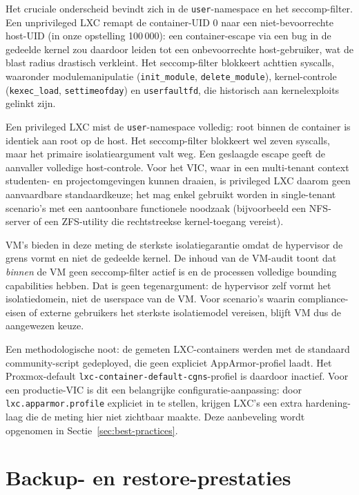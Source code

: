 Het cruciale onderscheid bevindt zich in de \texttt{user}-namespace en het seccomp-filter. Een unprivileged LXC remapt de container-UID 0 naar een niet-bevoorrechte host-UID (in onze opstelling 100\,000): een container-escape via een bug in de gedeelde kernel zou daardoor leiden tot een onbevoorrechte host-gebruiker, wat de blast radius drastisch verkleint. Het seccomp-filter blokkeert achttien syscalls, waaronder modulemanipulatie (\texttt{init\_module}, \texttt{delete\_module}), kernel-controle (\texttt{kexec\_load}, \texttt{settimeofday}) en \texttt{userfaultfd}, die historisch aan kernelexploits gelinkt zijn.

Een privileged LXC mist de \texttt{user}-namespace volledig: root binnen de container is identiek aan root op de host. Het seccomp-filter blokkeert wel zeven syscalls, maar het primaire isolatieargument valt weg. Een geslaagde escape geeft de aanvaller volledige host-controle. Voor het VIC, waar in een multi-tenant context studenten- en projectomgevingen kunnen draaien, is privileged LXC daarom geen aanvaardbare standaardkeuze; het mag enkel gebruikt worden in single-tenant scenario's met een aantoonbare functionele noodzaak (bijvoorbeeld een NFS-server of een ZFS-utility die rechtstreekse kernel-toegang vereist).

VM's bieden in deze meting de sterkste isolatiegarantie omdat de hypervisor de grens vormt en niet de gedeelde kernel. De inhoud van de VM-audit toont dat \emph{binnen} de VM geen seccomp-filter actief is en de processen volledige bounding capabilities hebben. Dat is geen tegenargument: de hypervisor zelf vormt het isolatiedomein, niet de userspace van de VM. Voor scenario's waarin compliance-eisen of externe gebruikers het sterkste isolatiemodel vereisen, blijft VM dus de aangewezen keuze.

Een methodologische noot: de gemeten LXC-containers werden met de standaard community-script gedeployed, die geen expliciet AppArmor-profiel laadt. Het Proxmox-default \texttt{lxc-container-default-cgns}-profiel is daardoor inactief. Voor een productie-VIC is dit een belangrijke configuratie-aanpassing: door \texttt{lxc.apparmor.profile} expliciet in te stellen, krijgen LXC's een extra hardening-laag die de meting hier niet zichtbaar maakte. Deze aanbeveling wordt opgenomen in Sectie~\ref{sec:best-practices}.

\section{Backup- en restore-prestaties}
\label{sec:resultaten-backup}

